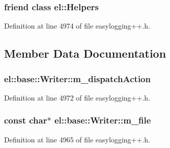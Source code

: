 \subsubsection[{el\+::\+Helpers}]{\setlength{\rightskip}{0pt plus 5cm}friend class {\bf el\+::\+Helpers}\hspace{0.3cm}{\ttfamily [friend]}}\label{classel_1_1base_1_1_writer_a2fb8a2c02cbf86247f093c118bed877a}


Definition at line 4974 of file easylogging++.\+h.



\subsection{Member Data Documentation}
\hypertarget{classel_1_1base_1_1_writer_acbea5b77953cf6e39baab015e83a4100}{}
\subsubsection[{m\+\_\+dispatch\+Action}]{ el\+::base\+::\+Writer\+::m\+\_\+dispatch\+Action\hspace{0.3cm}{\ttfamily [protected]}}\label{classel_1_1base_1_1_writer_acbea5b77953cf6e39baab015e83a4100}


Definition at line 4972 of file easylogging++.\+h.

\hypertarget{classel_1_1base_1_1_writer_a1eada1175721ba11b4eb6c9515d8e2dc}{}
\subsubsection[{m\+\_\+file}]{\setlength{\rightskip}{0pt plus 5cm}const char$\ast$ el\+::base\+::\+Writer\+::m\+\_\+file\hspace{0.3cm}{\ttfamily [protected]}}\label{classel_1_1base_1_1_writer_a1eada1175721ba11b4eb6c9515d8e2dc}


Definition at line 4965 of file easylogging++.\+h.

\hypertarget{classel_1_1base_1_1_writer_a57291e0751fe93547d9d5551fb3e8415}{}
